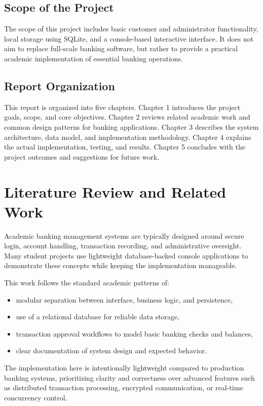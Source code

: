 \documentclass[12pt,a4paper]{report}
\begin{document}
\section{Scope of the Project}
The scope of this project includes basic customer and administrator functionality, local storage using SQLite, and a console-based interactive interface. It does not aim to replace full-scale banking software, but rather to provide a practical academic implementation of essential banking operations.

\section{Report Organization}
This report is organized into five chapters. Chapter 1 introduces the project goals, scope, and core objectives. Chapter 2 reviews related academic work and common design patterns for banking applications. Chapter 3 describes the system architecture, data model, and implementation methodology. Chapter 4 explains the actual implementation, testing, and results. Chapter 5 concludes with the project outcomes and suggestions for future work.

\chapter{Literature Review and Related Work}
Academic banking management systems are typically designed around secure login, account handling, transaction recording, and administrative oversight. Many student projects use lightweight database-backed console applications to demonstrate these concepts while keeping the implementation manageable.

This work follows the standard academic patterns of:
\begin{itemize}
  \item modular separation between interface, business logic, and persistence,
  \item use of a relational database for reliable data storage,
  \item transaction approval workflows to model basic banking checks and balances,
  \item clear documentation of system design and expected behavior.
\end{itemize}

The implementation here is intentionally lightweight compared to production banking systems, prioritizing clarity and correctness over advanced features such as distributed transaction processing, encrypted communication, or real-time concurrency control.
\end{document}
